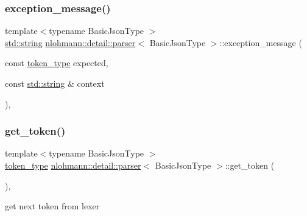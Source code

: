 \subsubsection{\texorpdfstring{exception\_message()}{exception\_message()}}
{\footnotesize\ttfamily template$<$typename Basic\+Json\+Type $>$ \\
\mbox{\hyperlink{namespacenlohmann_1_1detail_a1ed8fc6239da25abcaf681d30ace4985ab45cffe084dd3d20d928bee85e7b0f21}{std\+::string}} \mbox{\hyperlink{classnlohmann_1_1detail_1_1parser}{nlohmann\+::detail\+::parser}}$<$ Basic\+Json\+Type $>$\+::exception\+\_\+message (\begin{DoxyParamCaption}\item[{const \mbox{\hyperlink{classnlohmann_1_1detail_1_1parser_a21d247111b332785b7acf3f8e487d117}{token\+\_\+type}}}]{expected,  }\item[{const \mbox{\hyperlink{namespacenlohmann_1_1detail_a1ed8fc6239da25abcaf681d30ace4985ab45cffe084dd3d20d928bee85e7b0f21}{std\+::string}} \&}]{context }\end{DoxyParamCaption})\hspace{0.3cm}{\ttfamily [inline]}, {\ttfamily [private]}}

\mbox{\label{classnlohmann_1_1detail_1_1parser_a33f3859d0dd402445b5859070fd24bab}} 
\subsubsection{\texorpdfstring{get\_token()}{get\_token()}}
{\footnotesize\ttfamily template$<$typename Basic\+Json\+Type $>$ \\
\mbox{\hyperlink{classnlohmann_1_1detail_1_1parser_a21d247111b332785b7acf3f8e487d117}{token\+\_\+type}} \mbox{\hyperlink{classnlohmann_1_1detail_1_1parser}{nlohmann\+::detail\+::parser}}$<$ Basic\+Json\+Type $>$\+::get\+\_\+token (\begin{DoxyParamCaption}{ }\end{DoxyParamCaption})\hspace{0.3cm}{\ttfamily [inline]}, {\ttfamily [private]}}



get next token from lexer 

